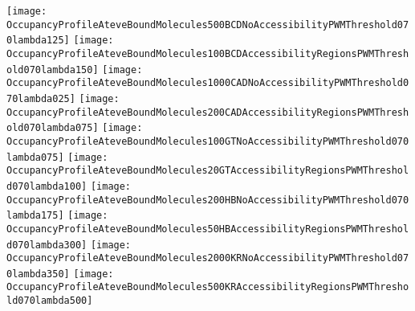 \documentclass[11pt]{article}
\begin{document}
 

\clearpage

\begin{center}
\texttt{[image: OccupancyProfileAteveBoundMolecules500BCDNoAccessibilityPWMThreshold070lambda125]}
\texttt{[image: OccupancyProfileAteveBoundMolecules100BCDAccessibilityRegionsPWMThreshold070lambda150]}
\texttt{[image: OccupancyProfileAteveBoundMolecules1000CADNoAccessibilityPWMThreshold070lambda025]}
\texttt{[image: OccupancyProfileAteveBoundMolecules200CADAccessibilityRegionsPWMThreshold070lambda075]}
\texttt{[image: OccupancyProfileAteveBoundMolecules100GTNoAccessibilityPWMThreshold070lambda075]}
\texttt{[image: OccupancyProfileAteveBoundMolecules20GTAccessibilityRegionsPWMThreshold070lambda100]}
\texttt{[image: OccupancyProfileAteveBoundMolecules200HBNoAccessibilityPWMThreshold070lambda175]}
\texttt{[image: OccupancyProfileAteveBoundMolecules50HBAccessibilityRegionsPWMThreshold070lambda300]}
\texttt{[image: OccupancyProfileAteveBoundMolecules2000KRNoAccessibilityPWMThreshold070lambda350]}
\texttt{[image: OccupancyProfileAteveBoundMolecules500KRAccessibilityRegionsPWMThreshold070lambda500]}
\end{center}
\end{document}
